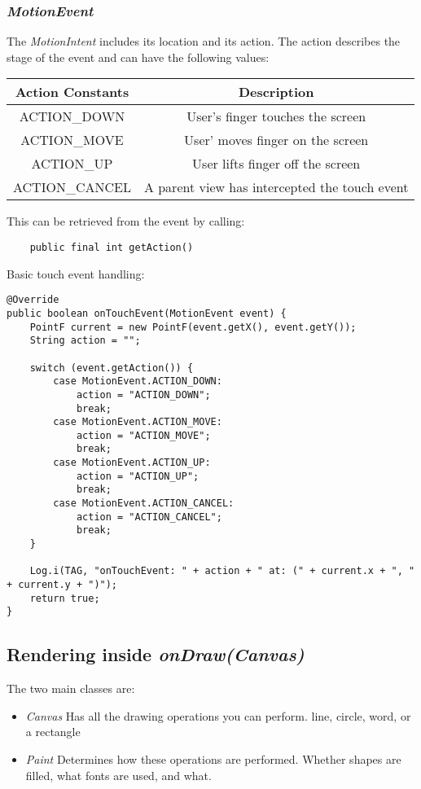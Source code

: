 \documentclass[]{article}
\renewcommand{\it}[1]{\textit{#1}}
\begin{document}
\subsubsection{\it{MotionEvent}}
The \it{MotionIntent} includes its location and its action.  The action describes the stage of the event and can have the following values:
\begin{center}
	\begin{tabular}{| c | c |} 
		\hline
		Action Constants  & Description  \\ [0.5ex] 
		\hline 
		ACTION\_DOWN & User's finger touches the screen   \\ [1ex]
		ACTION\_MOVE & User' moves finger on the screen   \\ [1ex]
		ACTION\_UP & User lifts finger off the screen  \\ [1ex]
		ACTION\_CANCEL & A parent view has intercepted the touch event   \\  [1ex] 
		\hline
	\end{tabular}
\end{center}
This can be retrieved from the event by calling:
\begin{lstlisting}
	public final int getAction()
\end{lstlisting}
Basic touch event handling:
\begin{lstlisting}
@Override
public boolean onTouchEvent(MotionEvent event) {
	PointF current = new PointF(event.getX(), event.getY());
	String action = "";
	
	switch (event.getAction()) {
		case MotionEvent.ACTION_DOWN:
			action = "ACTION_DOWN";
			break;
		case MotionEvent.ACTION_MOVE:
			action = "ACTION_MOVE";
			break;
		case MotionEvent.ACTION_UP:
			action = "ACTION_UP";
			break;
		case MotionEvent.ACTION_CANCEL:
			action = "ACTION_CANCEL";
			break;
	}
	
	Log.i(TAG, "onTouchEvent: " + action + " at: (" + current.x + ", " + current.y + ")");
	return true;
}
\end{lstlisting}

\subsection{Rendering inside \it{onDraw(Canvas)}}
The two main classes are:
\begin{itemize}
	\item \it{Canvas}
	\subitem Has all the drawing operations you can perform.
	\subitem line, circle, word, or a rectangle
	
	\item \it{Paint} 
	\subitem Determines how these operations are performed.
	\subitem Whether shapes are filled, what fonts are used, and what.
\end{itemize}
\end{document}
